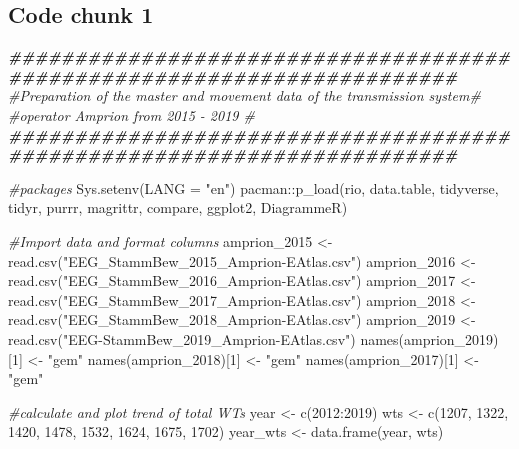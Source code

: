 \documentclass[a4paper,11pt]{article}
\newenvironment{Shaded}{\begin{snugshade}}{\end{snugshade}}
\newcommand{\AttributeTok}[1]{\textcolor[rgb]{0.77,0.63,0.00}{#1}}
\newcommand{\CommentTok}[1]{\textcolor[rgb]{0.56,0.35,0.01}{\textit{#1}}}
\newcommand{\DecValTok}[1]{\textcolor[rgb]{0.00,0.00,0.81}{#1}}
\newcommand{\DocumentationTok}[1]{\textcolor[rgb]{0.56,0.35,0.01}{\textbf{\textit{#1}}}}
\newcommand{\FunctionTok}[1]{\textcolor[rgb]{0.00,0.00,0.00}{#1}}
\newcommand{\NormalTok}[1]{#1}
\newcommand{\OtherTok}[1]{\textcolor[rgb]{0.56,0.35,0.01}{#1}}
\newcommand{\SpecialCharTok}[1]{\textcolor[rgb]{0.00,0.00,0.00}{#1}}
\newcommand{\StringTok}[1]{\textcolor[rgb]{0.31,0.60,0.02}{#1}}
\begin{document}
\hypertarget{code-chunk-1}{%
\subsection{Code chunk 1}\label{code-chunk-1}}
\begin{Shaded}
\begin{Highlighting}[]
\DocumentationTok{\#\#\#\#\#\#\#\#\#\#\#\#\#\#\#\#\#\#\#\#\#\#\#\#\#\#\#\#\#\#\#\#\#\#\#\#\#\#\#\#\#\#\#\#\#\#\#\#\#\#\#\#\#\#\#\#\#\#\#\#\#\#\#\#\#\#\#\#\#\#\#\#}
\CommentTok{\#Preparation of the master and movement data of the transmission system\# }
\CommentTok{\#operator Amprion from 2015 {-} 2019                                     \#}
\DocumentationTok{\#\#\#\#\#\#\#\#\#\#\#\#\#\#\#\#\#\#\#\#\#\#\#\#\#\#\#\#\#\#\#\#\#\#\#\#\#\#\#\#\#\#\#\#\#\#\#\#\#\#\#\#\#\#\#\#\#\#\#\#\#\#\#\#\#\#\#\#\#\#\#\#}

\CommentTok{\#packages}
\FunctionTok{Sys.setenv}\NormalTok{(}\AttributeTok{LANG =} \StringTok{"en"}\NormalTok{)}
\NormalTok{pacman}\SpecialCharTok{::}\FunctionTok{p\_load}\NormalTok{(rio, data.table, tidyverse, tidyr, purrr, magrittr, compare, }
\NormalTok{               ggplot2, DiagrammeR)}

\CommentTok{\#Import data and format columns}
\NormalTok{amprion\_2015 }\OtherTok{\textless{}{-}} \FunctionTok{read.csv}\NormalTok{(}\StringTok{"EEG\_StammBew\_2015\_Amprion{-}EAtlas.csv"}\NormalTok{)}
\NormalTok{amprion\_2016 }\OtherTok{\textless{}{-}} \FunctionTok{read.csv}\NormalTok{(}\StringTok{"EEG\_StammBew\_2016\_Amprion{-}EAtlas.csv"}\NormalTok{)}
\NormalTok{amprion\_2017 }\OtherTok{\textless{}{-}} \FunctionTok{read.csv}\NormalTok{(}\StringTok{"EEG\_StammBew\_2017\_Amprion{-}EAtlas.csv"}\NormalTok{)}
\NormalTok{amprion\_2018 }\OtherTok{\textless{}{-}} \FunctionTok{read.csv}\NormalTok{(}\StringTok{"EEG\_StammBew\_2018\_Amprion{-}EAtlas.csv"}\NormalTok{)}
\NormalTok{amprion\_2019 }\OtherTok{\textless{}{-}} \FunctionTok{read.csv}\NormalTok{(}\StringTok{"EEG{-}StammBew\_2019\_Amprion{-}EAtlas.csv"}\NormalTok{)}
\FunctionTok{names}\NormalTok{(amprion\_2019)[}\DecValTok{1}\NormalTok{] }\OtherTok{\textless{}{-}} \StringTok{"gem"}
\FunctionTok{names}\NormalTok{(amprion\_2018)[}\DecValTok{1}\NormalTok{] }\OtherTok{\textless{}{-}} \StringTok{"gem"}
\FunctionTok{names}\NormalTok{(amprion\_2017)[}\DecValTok{1}\NormalTok{] }\OtherTok{\textless{}{-}} \StringTok{"gem"}

\CommentTok{\#calculate and plot trend of total WT\textquotesingle{}s}
\NormalTok{year }\OtherTok{\textless{}{-}} \FunctionTok{c}\NormalTok{(}\DecValTok{2012}\SpecialCharTok{:}\DecValTok{2019}\NormalTok{)}
\NormalTok{wts }\OtherTok{\textless{}{-}} \FunctionTok{c}\NormalTok{(}\DecValTok{1207}\NormalTok{, }\DecValTok{1322}\NormalTok{, }\DecValTok{1420}\NormalTok{, }\DecValTok{1478}\NormalTok{, }\DecValTok{1532}\NormalTok{, }\DecValTok{1624}\NormalTok{, }\DecValTok{1675}\NormalTok{, }\DecValTok{1702}\NormalTok{)}
\NormalTok{year\_wts }\OtherTok{\textless{}{-}} \FunctionTok{data.frame}\NormalTok{(year, wts)}


\end{Highlighting}
\end{Shaded}
\end{document}
